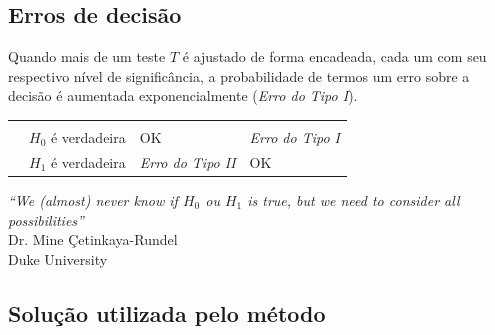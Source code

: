 \documentclass{bredelebeamer}
\begin{document}
\subsection{Erros de decisão}

\begin{frame}
\begin{center}
Quando mais de um teste $T$ é ajustado de forma encadeada, cada um com
seu respectivo nível de significância, a probabilidade de termos um erro
sobre a decisão é aumentada exponencialmente (\emph{Erro do Tipo I}).
\end{center}

\vspace{.1cm}

\begin{table}
\begin{tabular}{| >{\centering}m{0.8in} | >{\centering}m{0.8in} |
    >{\centering}m{1in} | >{\centering\arraybackslash}m{0.8in} |}
\hline
\rowcolor{Blue!60}
\multicolumn{4}{|r|}{Decisão} \\ \hline 
 & & \cellcolor{LightCyan}{Falha em rejeitar $H_{0}$} & 
 \cellcolor{Blue!20}{rejeita $H_{0}$} \\ \hline 
\multirow{2}{*}{
  \begin{sideways}
    Verdade
  \end{sideways}
}
 & $H_{0}$ é verdadeira & OK & \emph{Erro do Tipo I} \\[2ex] \cline{2-4}
 & $H_{1}$ é verdadeira & \emph{Erro do Tipo II} & OK \\[2ex] \hline
\end{tabular}
\end{table}

\vspace{.1cm}

\begin{flushright}
\textit{``We (almost) never know if $H_{0}$ ou $H_{1}$ is true, but we need to
  consider all possibilities''} \\
\footnotesize{Dr. Mine Çetinkaya-Rundel \\
Duke University}
\end{flushright}
\end{frame}

\subsection{Solução utilizada pelo método}
\end{document}
